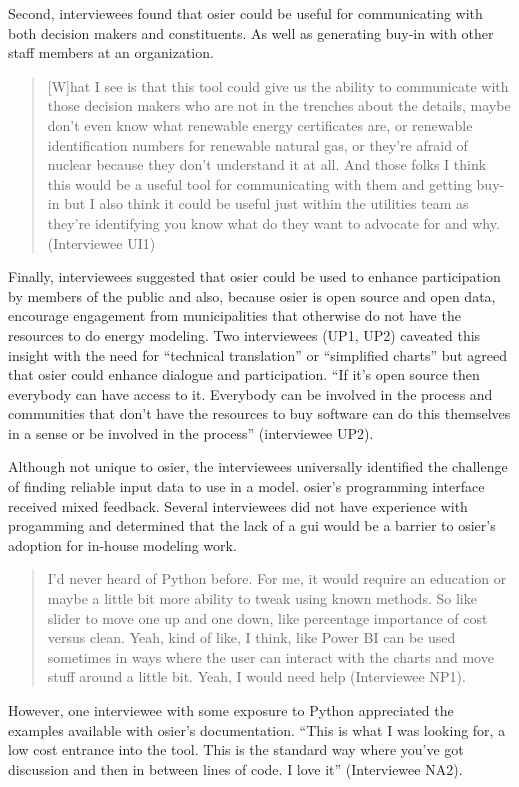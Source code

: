 Second, interviewees found that \ac{osier} could be useful for communicating
with both decision makers and constituents. As well as generating buy-in with
other staff members at an organization.
\begin{quote}
    [W]hat I see is that this tool could give us the ability to communicate with
    those decision makers who are not in the trenches about the details, maybe
    don't even know what renewable energy certificates are, or renewable
    identification numbers for renewable natural gas, or they're afraid of
    nuclear because they don't understand it at all. And those folks I think
    this would be a useful tool for communicating with them and getting buy-in
    but I also think it could be useful just within the utilities team as
    they're identifying you know what do they want to advocate for and why.
    (Interviewee UI1)
\end{quote}

Finally, interviewees suggested that \ac{osier} could be used to enhance
participation by members of the public and also, because \ac{osier} is open
source and open data, encourage engagement from municipalities that otherwise do
not have the resources to do energy modeling. Two interviewees (UP1, UP2)
caveated this insight with the need for ``technical translation'' or
``simplified charts'' but agreed that \ac{osier} could enhance dialogue and
participation. ``If it's open source then everybody can have access to it.
Everybody can be involved in the process and communities that don't have the
resources to buy software can do this themselves in a sense or be involved in
the process'' (interviewee UP2). 

Although not unique to \ac{osier}, the interviewees universally identified the
challenge of finding reliable input data to use in a model. \ac{osier}'s
programming interface received mixed feedback. Several interviewees did not have
experience with progamming and determined that the lack of a \ac{gui} would be a
barrier to \ac{osier}'s adoption for in-house modeling work. 
\begin{quote}
    I'd never heard of Python before. For me, it would require an education or
    maybe a little bit more ability to tweak using known methods. So like slider
    to move one up and one down, like percentage importance of cost versus
    clean. Yeah, kind of like, I think, like Power BI can be used sometimes in
    ways where the user can interact with the charts and move stuff around a
    little bit. Yeah, I would need help (Interviewee NP1).
\end{quote}
However, one interviewee with some exposure to Python appreciated the examples
available with \ac{osier}'s documentation. ``This is what I was looking for, a
low cost entrance into the tool. This is the standard way where you've got
discussion and then in between lines of code. I love it'' (Interviewee NA2).


